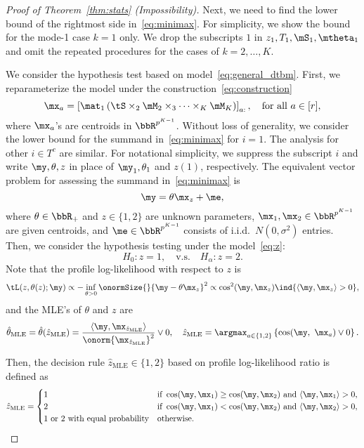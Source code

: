 \documentclass[lettersize,onecolumn,journal]{IEEEtran}
\theoremstyle{definition}
\theoremstyle{definition}
\newcommand{\of}[1]{\left(#1\right)}
\newcommand{\off}[1]{\left[#1\right]}
\newcommand{\offf}[1]{\left\{#1\right\}}
\begin{document}
\begin{proof}[Proof of Theorem~\ref{thm:stats} (Impossibility)]
Next, we need to find the lower bound of the rightmost side in~\eqref{eq:minimax}. For simplicity, we show the bound for the mode-1 case $k = 1$ only. We drop the subscripts $1$ in $z_1, T_1, \mS_1, \mtheta_1$ and omit the repeated procedures for the cases of $k = 2,\ldots, K$. 

We consider the hypothesis test based on model~\eqref{eq:general_dtbm}. First, we reparameterize the model under the construction~\eqref{eq:construction}
\begin{equation}
    \mx_a = \off{\mat_1 \of{ \tS\times_2 \mM_2\times_3\cdots \times_K \mM_K }}_{a:}, \quad \text{for all} \ a \in [r],
\end{equation}
where $\mx_a$'s are centroids in $\bbR^{p^{K-1}}$. Without loss of generality, we consider the lower bound for the summand in~\eqref{eq:minimax} for $i=1$. The analysis for other $i\in T^c$ are similar. For notational simplicity, we suppress the subscript $i$ and write $\my, \theta, z$ in place of $\my_1, \theta_1$ and $z(1)$, respectively. The equivalent vector problem for assessing the summand in~\eqref{eq:minimax} is
\begin{equation}\label{eq:z}
\my=\theta\mx_{z}+\me,
\end{equation}
where $\theta\in\bbR_{+}$ and $z\in \{1,2\}$ are unknown parameters, $\mx_1,\mx_2\in\bbR^{p^{K-1}}$ are given centroids, and $\me\in\bbR^{p^{K-1}}$ consists of i.i.d.\ $N(0,\sigma^2)$ entries.  Then, we consider the hypothesis testing under the model~\eqref{eq:z}:
\begin{equation}\label{eq:test}
H_0\colon z=1, \quad \text{v.s.}\quad H_\alpha\colon z=2.
\end{equation}
Note that the profile log-likelihood with respect to $z$ is
\[
\tL(z,  \theta(z);\my)\propto - \inf_{\theta>0}\onormSize{}{\my- \theta\mx_{z}}^2 \propto  \cos^2(\my, \mx_{z}) \ind\{ \langle \my,\mx_{z}\rangle  >0 \}, 
\]
and the MLE's of $\theta$ and $z$ are
\begin{equation}\label{eq:MLE}
    \hat \theta_{\text{MLE}}= \hat \theta(\hat z_{\text{MLE}})={\langle \my,\mx_{\hat z_{\text{MLE}}}\rangle \over \onorm{\mx_{\hat z_{\text{MLE}}}}^2}\vee 0 , \quad 
\hat z_{\text{MLE}}= \argmax_{a\in\{1,2\}} \offf{\cos(\my,\ \mx_a)\vee 0}. 
\end{equation}

Then, the decision rule $\hat z_{\text{MLE}} \in\{1,2\}$ based on profile log-likelihood ratio is defined as
\begin{equation}\label{eq:ratio}
\hat z_{\text{MLE}}=
\begin{cases}
1 & \text{if }\cos(\my,\mx_1)\geq  \cos(\my,\mx_2) \text{ and }\langle \my,\mx_1\rangle > 0, \\
2 & \text{if }\cos(\my,\mx_1)<\cos(\my,\mx_2) \text{ and }\langle \my,\mx_2\rangle > 0,\\
\text{1 or 2 with equal probability} & \text{otherwise.}
\end{cases}
\end{equation}


\end{proof}
\end{document}

